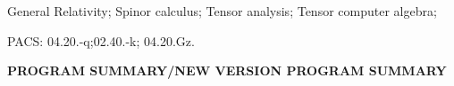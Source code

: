 \documentclass[final,3p,times,twocolumn]{elsarticle}
\begin{document}
\begin{frontmatter}

\begin{abstract}
The {\em Spinors} software is a {\em Mathematica} package which implements 
2-component spinor calculus as devised by Penrose for General Relativity in 
dimension 3+1. 
The {\em Spinors} software is part of the {\em xAct} system, which is a collection of {\em Mathematica} packages to do tensor analysis by computer. 
In this paper we give a thorough 
description of {\em Spinors} and present practical examples of use.

\end{abstract}

\begin{keyword}
General Relativity; Spinor calculus; Tensor analysis; Tensor computer algebra; 

PACS: 04.20.-q;02.40.-k; 04.20.Gz.
\end{keyword}

\end{frontmatter}



{\bf PROGRAM SUMMARY/NEW VERSION PROGRAM SUMMARY}
\end{document}
